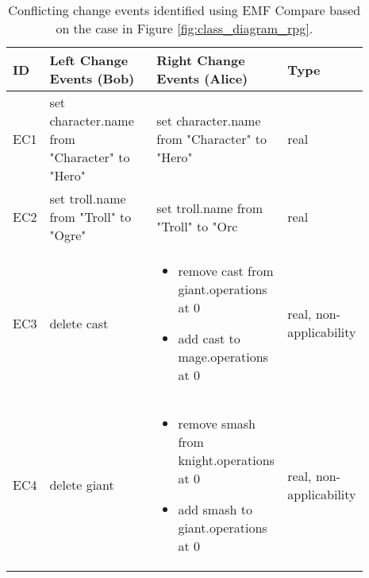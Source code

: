 \begin{table*}[ht]
  \centering
  \caption{Conflicting change events identified using EMF Compare based on the case in Figure \ref{fig:class_diagram_rpg}.}
  \begin{scriptsize}
  \label{table:emfc_conflicts}
  \begin{tabular}{|p{0.04\linewidth}|p{0.37\linewidth}|p{0.37\linewidth}|
      p{0.11\linewidth}|}
    \hline
    \textbf{ID} & 
    \textbf{Left Change Events (Bob)} & 
    \textbf{Right Change Events (Alice)} & 
    \textbf{Type}\\ 
    \hline
    EC1 & 
    set character.name from "Character" to "Hero" & 
    set character.name from "Character" to "Hero" & 
    real \\
    \hline
    EC2 & set troll.name from "Troll" to "Ogre" & 
    set troll.name from "Troll" to "Orc & 
    real \\ 
    \hline
    EC3 & 
    delete cast
    & 
    \begin{minipage}[t]{\linewidth}
      \raggedright
      \begin{itemize}[leftmargin=0pt]
        \setlength
        \item[] remove cast from giant.operations at 0
        \item[] add cast to mage.operations at 0
      \end{itemize}
    \end{minipage}
    & 
    real, non-applicability\\
    \hline
    EC4 & 
    delete giant
    & 
    \begin{minipage}[t]{\linewidth}
      \raggedright
      \begin{itemize}[leftmargin=0pt]
        \setlength
        \item[] remove smash from knight.operations at 0
        \item[] add smash to giant.operations at 0
      \end{itemize}
    \end{minipage}
    & 
    real, non-applicability\\
    \hline
  \end{tabular}
\end{scriptsize}
\end{table*}

